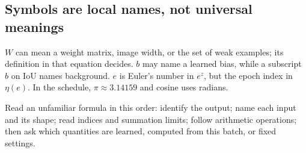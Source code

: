 \documentclass[11pt,letterpaper]{article}
\newcommand{\note}[1]{\par\vspace{3pt}\begingroup\setlength{\fboxsep}{8pt}%
 \colorbox{pale}{\parbox{\dimexpr\linewidth-2\fboxsep\relax}{#1}}\endgroup\par\vspace{3pt}}
\begin{document}
\subsection*{Symbols are local names, not universal meanings}
$W$ can mean a weight matrix, image width, or the set of weak examples; its definition in that equation decides. $b$ may name a learned bias, while a subscript $b$ on IoU names background. $e$ is Euler's number in $e^z$, but the epoch index in $\eta(e)$. In the schedule, $\pi\approx3.14159$ and cosine uses radians.

\note{Read an unfamiliar formula in this order: identify the output; name each input and its shape; read indices and summation limits; follow arithmetic operations; then ask which quantities are learned, computed from this batch, or fixed settings.}
\end{document}
